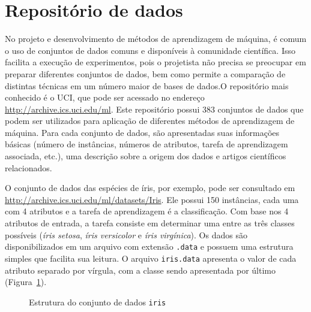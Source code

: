 \section{Repositório de dados}

No projeto e desenvolvimento de métodos de aprendizagem de máquina, é comum o uso de conjuntos de dados comuns e disponíveis à comunidade científica. Isso facilita a execução de experimentos, pois o projetista não precisa se preocupar em preparar diferentes conjuntos de dados, bem como permite a comparação de distintas técnicas em um número maior de bases de dados.O repositório mais conhecido é o UCI, que pode ser acessado no endereço \url{http://archive.ics.uci.edu/ml}. Este repositório possui 383 conjuntos de dados que podem ser utilizados para aplicação de diferentes métodos de aprendizagem de máquina. Para cada conjunto de dados, são apresentadas suas informações básicas (número de instâncias, números de atributos, tarefa de aprendizagem associada, etc.), uma descrição sobre a origem dos dados e artigos científicos relacionados.

O conjunto de dados das espécies de íris, por exemplo, pode ser consultado em \url{http://archive.ics.uci.edu/ml/datasets/Iris}. Ele possui 150 instâncias, cada uma com 4 atributos e a tarefa de aprendizagem é a classificação. Com base nos 4 atributos de entrada, a tarefa consiste em determinar uma entre as três classes possíveis (\textit{íris setosa}, \textit{íris versicolor} e \textit{íris virgínica}). Os dados são disponibilizados em um arquivo com extensão \texttt{.data} e possuem uma estrutura simples que facilita sua leitura. O arquivo \texttt{iris.data} apresenta o valor de cada atributo separado por vírgula, com a classe sendo apresentada por último (Figura~\ref{fig:estrutura-dados-iris}).

\begin{figure}[h]

\caption{Estrutura do conjunto de dados \texttt{iris}}
\label{fig:estrutura-dados-iris}
\end{figure}

